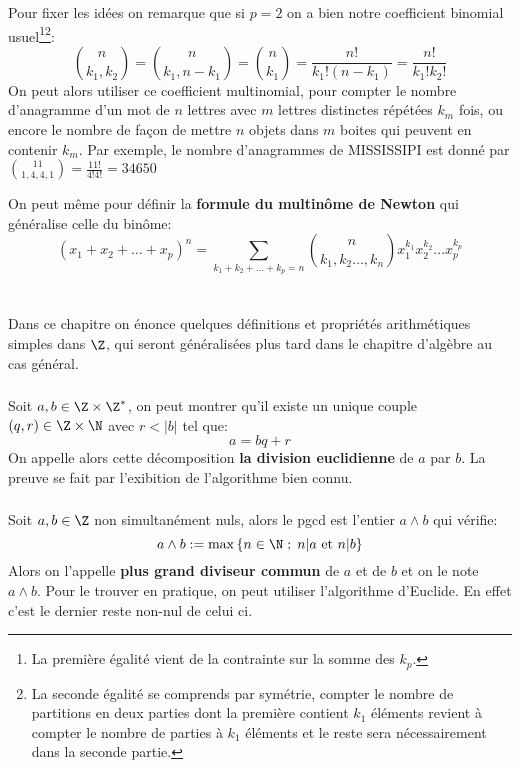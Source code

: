 Pour fixer les idées on remarque que si \(p = 2\) on a bien notre coefficient binomial usuel\footnote{
   La première égalité vient de la contrainte sur la somme des \(k_p\).
}\footnote{La seconde égalité se comprends par symétrie, compter le nombre de partitions en deux parties dont la première contient \(k_1\) éléments revient à compter le nombre de parties à \(k_1\) éléments et le reste sera nécessairement dans la seconde partie.}:
\[
   \binom{n}{k_1, k_2} =  \binom{n}{k_1, n - k_1} = \binom{n}{k_1} = \frac{n!}{k_1!(n-k_1)} = \frac{n!}{k_1!k_2!}
\]
On peut alors utiliser ce coefficient multinomial, pour compter le nombre d'anagramme d'un mot de \(n\) lettres avec \(m\) lettres distinctes répétées \(k_m\) fois, ou encore le nombre de façon de mettre \(n\) objets dans \(m\) boites qui peuvent en contenir \(k_m\).\+
Par exemple, le nombre d'anagrammes de MISSISSIPI est donné par \(\binom{11}{1 , 4, 4, 1}  = \frac{11!}{4!4!} = 34650\)\<

On peut même pour définir la \textbf{formule du multinôme de Newton} qui généralise celle du binôme:
\[
   (x_1 + x_2 + \ldots + x_p)^n = \sum_{k_1+k_2+\ldots+k_p = n} \binom{n}{k_1, k_2 \ldots, k_n} x_1^{k_1} x_2^{k_2} \ldots x_p^{k_p}
\]

\chapter*{}
Dans ce chapitre on énonce quelques définitions et propriétés arithmétiques simples dans \( \Z \), qui seront généralisées plus tard dans le chapitre d'algèbre au cas général.
\subsection*{}
Soit \(a, b \in \Z \times \Z^*\), on peut montrer qu'il existe un unique couple \((q, r) \in \Z \times \N\) avec \(r < |b|\) tel que:
\[ 
    a = bq + r
\]
On appelle alors cette décomposition \textbf{la division euclidienne} de \(a\) par \(b\). La preuve se fait par l'exibition de l'algorithme bien connu.

\subsection*{}
Soit \(a, b \in \Z\) non simultanément nuls, alors le pgcd est l'entier \(a \wedge b\) qui vérifie:
\[ 
    a \wedge b := \max \left\{ n \in \N \; ; \; n | a \text{ et } n | b \right\} 
\]
Alors on l'appelle \textbf{plus grand diviseur commun} de \(a\) et de \(b\) et on le note \(a \wedge b\). Pour le trouver en pratique, on peut utiliser l'algorithme d'Euclide. En effet c'est le dernier reste non-nul de celui ci.


